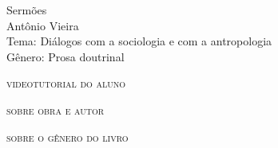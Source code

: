 \documentclass[smaller,professionalfonts,15pt]{beamer}
\begin{document}
										\begin{frame}\begin{raggedleft}
										\Huge 
Sermões						\\
										\huge 
Antônio Vieira							\\
										\bigskip
										\normalsize
Tema: Diálogos com a sociologia e com a antropologia		\\	
Gênero: Prosa doutrinal 			\\\vfill\hfill
\publishername
										\end{raggedleft}

\end{frame}


\begin{frame}{\textsc{videotutorial do aluno}}
\vspace{-2cm}\begin{figure}
\end{figure}
\end{frame}


\begin{frame}
\hfill\Huge
\textsc{sobre obra e autor}
\end{frame}

\begin{frame}
\hfill\Huge
\textsc{sobre o gênero do livro}
\end{frame}
\end{document}
